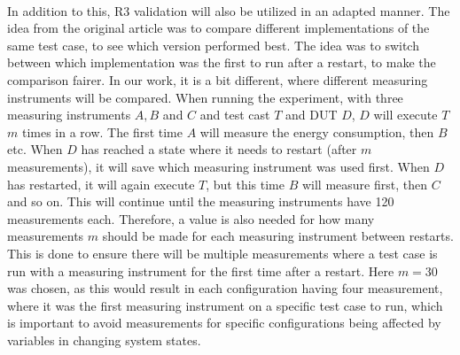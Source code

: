 \paragraph*{}
In addition to this, R3 validation\cite[]{Bokhari2020r3} will also be utilized in an adapted manner. The idea from the original article was to compare different implementations of the same test case, to see which version performed best. The idea was to switch between which implementation was the first to run after a restart, to make the comparison fairer. In our work, it is a bit different, where different measuring instruments will be compared. When running the experiment, with three measuring instruments $A, B$ and $C$ and test cast $T$ and DUT $D$, $D$ will execute $T$ $m$ times in a row. The first time $A$ will measure the energy consumption, then $B$ etc. When $D$ has reached a state where it needs to restart (after $m$ measurements), it will save which measuring instrument was used first. When $D$ has restarted, it will again execute $T$, but this time $B$ will measure first, then $C$ and so on. This will continue until the measuring instruments have 120 measurements each. Therefore, a value is also needed for how many measurements $m$ should be made for each measuring instrument between restarts. This is done to ensure there will be multiple measurements where a test case is run with a measuring instrument for the first time after a restart. Here $m=30$ was chosen, as this would result in each configuration having four measurement, where it was the first measuring instrument on a specific test case to run, which is important to avoid measurements for specific configurations being affected by variables in changing system states.
